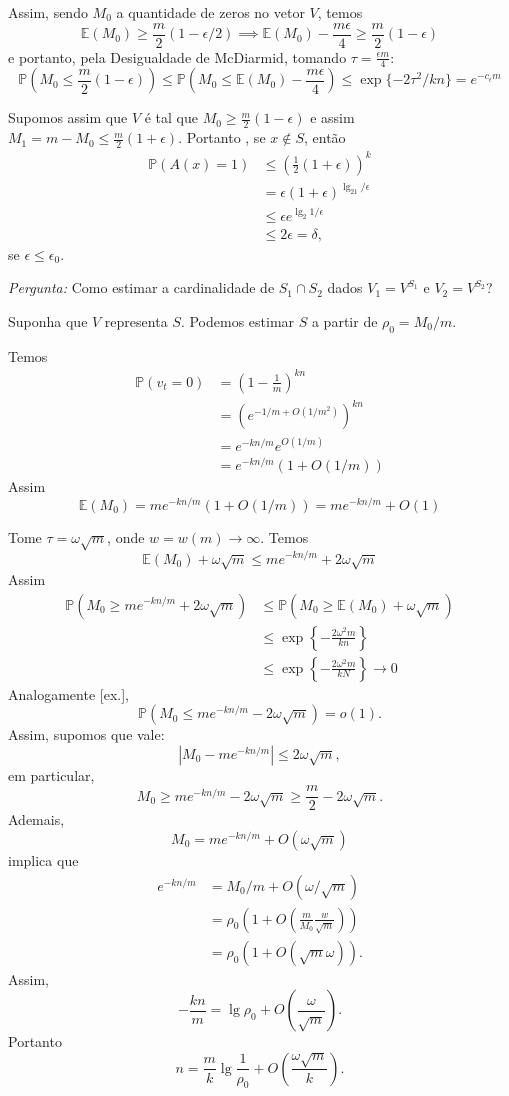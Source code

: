Assim, sendo $M_0$ a quantidade de zeros no vetor $V$,
temos
\[\mathbb{E}(M_0)\ge \frac{m}{2} (1-\epsilon/2) \implies \mathbb{E}(M_0)-\frac{m\epsilon}{4}\ge \frac{m}{2} (1-\epsilon)\]
e portanto, pela Desigualdade de McDiarmid, tomando $\tau = \frac{\epsilon m}{4}$:
\[\mathbb{P}(M_0 \le \frac{m}{2} (1-\epsilon)) \le  \mathbb{P}\left(M_0 \le \mathbb{E}(M_0)-\frac{m\epsilon}{4}\right)\le \exp\{-2\tau^2/kn\} = e^{-c_\epsilon m}\]

Supomos assim que $V$ \'e tal que $M_0\ge \frac{m}{2}(1-\epsilon)$ e assim $M_1 = m-M_0 \le \frac{m}{2}(1+\epsilon)$. 
Portanto , se $x\notin S$, ent\~ao 
\begin{align*}
\mathbb{P}(A(x)=1) &\le \left( \frac{1}{2} (1+\epsilon)\right)^k\\
					&=\epsilon(1+\epsilon)^{\lg_21/\epsilon}\\
					&\le \epsilon e^{\lg_2 1/\epsilon}\\
					&\le 2\epsilon = \delta,
\end{align*}
se $\epsilon \le \epsilon_0$.

\textit{Pergunta:} Como estimar a cardinalidade de $S_1\cap S_2$ dados $V_1=V^{S_1}$ e $V_2=V^{S_2}$?

Suponha que $V$ representa $S$. Podemos estimar $S$ a partir de $\rho_0 = M_0/m$.

Temos
\begin{align*}
\mathbb{P}(v_t=0)&= \left(1-\frac{1}{m}\right)^{kn}\\
                    &= \left(e^{-1/m+O(1/m^2)}\right)^{kn}\\
                    &=e^{-kn/m}e^{O({1/m})}\\
                    &=e^{-kn/m}(1+O(1/m))
\end{align*} 
Assim
\[\mathbb{E}(M_0) = me^{-kn/m}(1+O(1/m))=me^{-kn/m} + O(1)\]

Tome $\tau = \omega\sqrt{m}$, onde $w = w(m) \to \infty$. Temos
\[\mathbb{E}(M_0) + \omega\sqrt{m} \le me^{-kn/m} + 2\omega\sqrt m\]
Assim
\begin{align*}
\mathbb{P}(M_0 \ge me^{-kn/m} + 2\omega\sqrt m)&\le \mathbb{P}(M_0 \ge \mathbb{E}(M_0) + \omega\sqrt{m})\\
											   &\le \exp \left\{-\frac{2\omega^2m}{kn}\right\}\\
											   &\le \exp \left\{-\frac{2\omega^2m}{kN}\right\} \to 0
\end{align*}
Analogamente [ex.],
\[\mathbb{P}(M_0 \le me^{-kn/m} - 2\omega\sqrt m)= o(1).\]
Assim, supomos que vale:
\[|M_0 - me^{-kn/m}|\le 2\omega\sqrt{m},\]
em particular,
\[M_0 \ge me^{-kn/m} - 2\omega\sqrt m \ge \frac{m}{2}-2\omega\sqrt m.\]
Ademais,
\[M_0 = me^{-kn/m} + O(\omega\sqrt m)\]
implica que 
\begin{align*}
e^{-kn/m} &= M_0/m + O(\omega/\sqrt m)\\
		  &=\rho_0\left( 1 + O\left(\frac{m}{M_0}\frac{w}{\sqrt m}\right)\right)\\
		  &=\rho_0\left( 1 + O(\sqrt m \omega)\right). 
\end{align*}
Assim,
\[-\frac{kn}{m} = \lg \rho_0 + O\left(\frac{\omega}{\sqrt m}\right).\]
Portanto
\[n = \frac{m}{k} \lg \frac{1}{\rho_0} + O\left(\frac{\omega \sqrt m }{k}\right).\]

